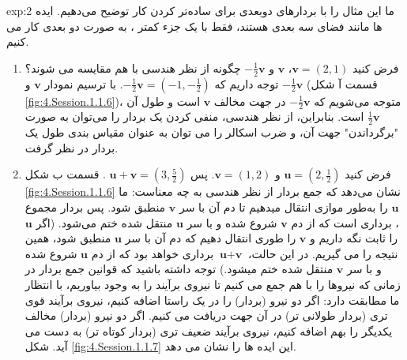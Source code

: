 {\begin{spacing}{1.5}
        \textbf{\vspace{-20pt}}
        \begin{example}{exp:2}
            \Large
            ما این مثال را با بردارهای دوبعدی برای ساده‌تر کردن کار توضیح می‌دهیم. ایده ها مانند فضای سه بعدی هستند، فقط با یک جزء کمتر ، به صورت دو بعدی کار می کنیم.\\
            \begin{enumerate}[label=\textbf{\arabic*}.]
                \item {فرض کنید $\textbf{v}=(2,1)$، $\textbf{v}$ و $-\frac{\displaystyle 1}{\displaystyle 2}\textbf{v}$ چگونه از نظر هندسی با هم مقایسه می شوند؟
                توجه داریم که $-\frac{\displaystyle 1}{\displaystyle 2}\textbf{v}=(-1,-\frac{\displaystyle 1}{\displaystyle 2})$.
                با ترسیم نمودار $\textbf{v}$ و $-\frac{\displaystyle 1}{\displaystyle 2}\textbf{v}$ (قسمت آ شکل \ref{fig:4.Session.1.1.6})،
                متوجه می‌شویم که $-\frac{\displaystyle 1}{\displaystyle 2}\textbf{v}$ در جهت مخالف $\textbf{v}$ است و طول آن $\frac{\displaystyle 1}{\displaystyle 2}\textbf{v}$ است.
                بنابراین، از نظر هندسی، منفی کردن یک بردار را می‌توان به صورت "برگرداندن" جهت آن،
                و ضرب اسکالر را می توان به عنوان مقیاس بندی طول یک بردار در نظر گرفت.}\\

                \item {فرض کنید $\textbf{u}=(2,\frac{\displaystyle 1}{\displaystyle 2})$ و $\textbf{v}=(1,2)$. پس $\textbf{u}+\textbf{v}=(3,\frac{\displaystyle 5}{\displaystyle 2})$ .
                قسمت ب شکل \ref{fig:4.Session.1.1.6} نشان می‌دهد که جمع بردار از نظر هندسی به چه معناست:
                ما $\textbf{u}$ را به‌طور موازی انتقال میدهیم تا دم آن با سر $\textbf{v}$ منطبق شود.
                پس بردار مجموع ، برداری است که از دم $\textbf{v}$ شروع شده و با سر $\textbf{u}$ منتقل شده ختم می‌شود.
                    (اگر $\textbf{u}$ را ثابت نگه داریم و $\textbf{v}$ را طوری انتقال دهیم که دم آن با سر $\textbf{u}$ منطبق شود، همین نتیجه را می گیریم.
                    در این حالت، $\textbf{u}+\textbf{v}$ برداری خواهد بود که از دم $\textbf{u}$ شروع شده و با سر $\textbf{v}$ منتقل شده ختم میشود.)
                    توجه داشته باشید که قوانین جمع بردار در زمانی که نیروها را با هم جمع می کنیم تا نیروی برآیند را به وجود بیاوریم، با انتظار ما مطابقت دارد:
                    اگر دو نیرو (بردار) را در یک راستا اضافه کنیم، نیروی برآیند قوی تری (بردار طولانی تر) در آن جهت دریافت می کنیم.
                    اگر دو نیرو (بردار) مخالف یکدیگر را بهم اضافه کنیم، نیروی برآیند ضعیف تری (بردار کوتاه تر) به دست می آید.
                    شکل \ref{fig:4.Session.1.1.7} این ایده ها را نشان می دهد.}\\


\end{enumerate}
\end{example}
\end{spacing}}

